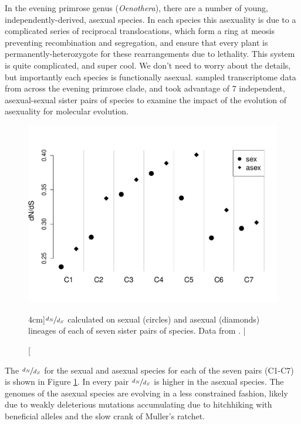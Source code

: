 In the evening primrose genus ({\it Oenothera}), there are a number of young, independently-derived, asexual species. In each species this asexuality is due to a complicated series of reciprocal translocations, %
which form a ring at meosis preventing recombination and segregation, and ensure that every plant is permanently-heterozygote for these rearrangements due to lethality. This system is quite complicated, and super cool. We don't need to worry about the details, but importantly each species is functionally asexual. \citet{hollister2014recurrent} sampled transcriptome data from across the evening primrose clade, and took advantage of 7 independent, asexual-sexual sister pairs of species to examine the impact of the evolution of asexuality for molecular evolution.  
\begin{figure}
\begin{center}
  \includegraphics[width = 0.8 \textwidth]{Journal_figs/recom_selection/evening_primrose/evening_primrose_omega.pdf}
\end{center}
\caption[][4cm]{$\nicefrac{d_N}{d_S}$ calculated on sexual (circles) and asexual (diamonds) lineages of each of seven sister pairs of species. Data from \citet{hollister2014recurrent}. | } \label{fig:evening_primrose_omega}  %
\end{figure}

The $\nicefrac{d_N}{d_S}$ for the sexual and asexual species for each of the seven pairs (C1-C7) is shown in Figure \ref{fig:evening_primrose_omega}. In every pair $\nicefrac{d_N}{d_S}$ is higher in the asexual species. The genomes of the asexual species are evolving in a less constrained fashion, likely due to weakly deleterious mutations accumulating due to hitchhiking with beneficial alleles and the slow crank of Muller's ratchet. 


